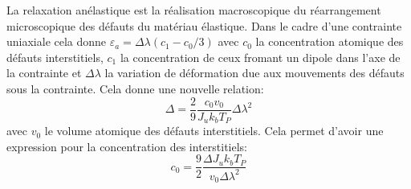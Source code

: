 La relaxation anélastique est la réalisation macroscopique du réarrangement microscopique des défauts du matériau élastique. Dans le cadre d'une contrainte uniaxiale cela donne \hbox{$\varepsilon_a = \Delta\lambda\left(c_1 - c_0/3\right)$} avec $c_0$ la concentration atomique des défauts interstitiels, $c_1$ la concentration de ceux fromant un dipole dans l'axe de la contrainte et $\Delta\lambda$ la variation de déformation due aux mouvements des défauts sous la contrainte. Cela donne une nouvelle relation:
\begin{equation}
    \Delta = \frac{2}{9}\frac{c_0 v_0}{J_u k_b T_P}\Delta\lambda^2
\end{equation}
avec $v_0$ le volume atomique des défauts interstitiels.
Cela permet d'avoir une expression pour la concentration des interstitiels:
\begin{equation}
    c_0 = \frac{9}{2}\frac{\Delta J_u k_b T_P}{v_0 \Delta \lambda^2}
\end{equation}